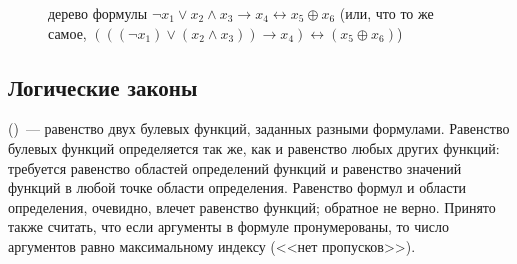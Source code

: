\begin{figure}[ht!]
\center
{}
\caption{дерево формулы $ \neg x_1 \vee x_2 \wedge x_3 \rightarrow x_4 \leftrightarrow x_5 \oplus x_6 $
(или, что то же самое, $ (((\neg x_1) \vee (x_2 \wedge x_3)) \rightarrow x_4) \leftrightarrow (x_5 \oplus x_6) $)}
\label{fig:boolean:tree_example}
\end{figure}

\FloatBarrier



\subsection{Логические законы}
\label{subsec:boolean:laws}



 ()~--- равенство двух булевых функций, заданных разными формулами.
Равенство булевых функций определяется так же, как и равенство любых других функций:
требуется равенство областей определений функций и равенство значений функций в любой точке области определения.
Равенство формул и области определения, очевидно, влечет равенство функций; обратное не верно.
Принято также считать, что если аргументы в формуле пронумерованы, то число аргументов равно максимальному индексу (<<нет пропусков>>).

